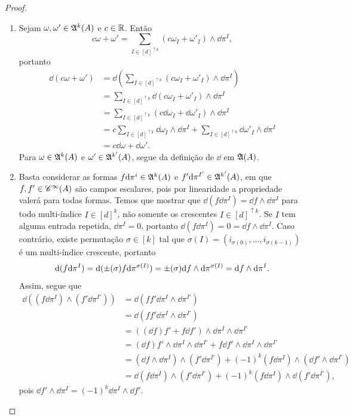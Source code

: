 \begin{proof}
	\begin{enumerate}
	\item Sejam $\omega,\omega' \in \mathfrak{A}^k (A)$ e $c \in \mathbb{R}$. Então
	\begin{equation*}
	c\omega + \omega' = \sum_{I \in [d]^{\uparrow k}} (c\omega_I + \omega'_I) \wedge \dd\pi^I,
	\end{equation*}	
portanto
		\begin{align*}
		\dd (c\omega + \omega') &= \dd \left( \sum_{I \in [d]^{\uparrow k}} (c\omega_I + \omega'_I) \wedge \dd\pi^I \right) \\
			&= \sum_{I \in [d]^{\uparrow k}} \dd(c\omega_I + \omega'_I) \wedge \dd\pi^I \\
			&= \sum_{I \in [d]^{\uparrow k}} (c\dd\omega_I + \dd\omega'_I) \wedge \dd\pi^I \\
			&= c\sum_{I \in [d]^{\uparrow k}} \dd\omega_I \wedge \dd\pi^I + \sum_{I \in [d]^{\uparrow k}} \dd\omega'_I \wedge \dd\pi^I \\
			&= c\dd\omega + \dd\omega'.
		\end{align*}
Para $\omega \in \mathfrak{A}^k (A)$ e $\omega' \in \mathfrak{A}^{k'} (A)$, segue da definição de $\dd$ em $\mathfrak{A} (A)$.
	
	\item Basta considerar as formas $f \mathrm{d}\pi^i \in \mathfrak{A}^k (A)$ e $f' \mathrm{d}\pi^{I'} \in \mathfrak{A}^{k'} (A)$, em que $f,f' \in \mathscr{C}^\infty(A)$ são campos escalares, pois por linearidade a propriedade valerá para todas formas. Temos que mostrar que $\dd(f \dd\pi^I)=\dd f \wedge \dd\pi^I$ para todo multi-índice $I \in [d]^k$, não somente os crescentes $I \in [d]^{\uparrow k}$. Se $I$ tem alguma entrada repetida, $\dd\pi^I = 0$, portanto $\dd(f \dd\pi^I) = 0 = \dd f \wedge \dd\pi^I$. Caso contrário, existe permutação $\sigma \in [k]$ tal que $\sigma(I) = (i_{\sigma(0)},\ldots,i_{\sigma(k-1)})$ é um multi-índice crescente, portanto
		\begin{equation*}
		\mathrm{d}(f \mathrm{d}\pi^I) = \mathrm{d}(\mathord{\pm}(\sigma)f \mathrm{d}\pi^{\sigma(I)}) = \mathord{\pm}(\sigma) \mathrm{d} f \wedge \mathrm{d}\pi^{\sigma(I)} = \mathrm{d} f \wedge \mathrm{d}\pi^I.
		\end{equation*}
Assim, segue que
	\begin{align*}
	\dd((f \dd\pi^I) \wedge (f' \dd\pi^{I'})) &= \dd(ff' \dd\pi^I \wedge \dd\pi^{I'}) \\
		&= \dd(ff' \dd\pi^I \wedge \dd\pi^{I'}) \\
		&= ((\dd f) f' + f \dd f') \wedge \dd\pi^I \wedge \dd\pi^{I'} \\
		&= (\dd f)f' \wedge \dd\pi^I \wedge \dd\pi^{I'} + f \dd f' \wedge \dd\pi^I \wedge \dd\pi^{I'} \\
		&= (\dd f \wedge \dd\pi^I) \wedge (f' \dd\pi^{I'}) + (-1)^k (f \dd\pi^I) \wedge (\dd f' \wedge \dd\pi^{I'}) \\
		&= \dd (f \dd\pi^I) \wedge (f' \dd\pi^{I'}) + (-1)^k (f \dd\pi^I) \wedge \dd (f' \dd\pi^{I'}),
	\end{align*}
pois $\dd f' \wedge \dd\pi^I = (-1)^k \dd\pi^I \wedge \dd f'$.
	

\end{enumerate}
\end{proof}
